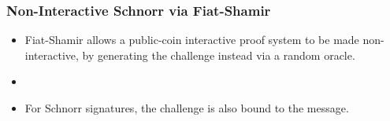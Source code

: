 \documentclass[hyperref={pdfpagelabels=true},table,dvipsnames,14pt,aspectratio=169]{beamer}
\begin{document}
\begin{frame}
  \centering
\scalebox{0.9} {
}
\end{frame}

\begin{frame}
  \frametitle{Non-Interactive Schnorr via Fiat-Shamir}

  \begin{itemize}
	  \item<1-> Fiat-Shamir allows a public-coin interactive proof system to be made non-interactive, 
	    by generating the challenge instead via a random oracle.
    \item[]
    \item<2-> For Schnorr signatures, the challenge is also bound to the message. 
  \end{itemize}
\end{frame}
\end{document}
